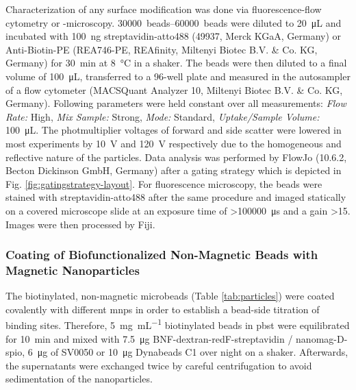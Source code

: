 Characterization of any surface modification was done via fluorescence-flow cytometry or -microscopy. \SIrange{30000}{60000}{beads} were diluted to \SI{20}{\micro\liter} and incubated with \SI{100}{\nano\gram} streptavidin-atto488 (49937, Merck KGaA, Germany) or Anti-Biotin-PE (REA746-PE, REAfinity, Miltenyi Biotec B.V. \& Co. KG, Germany) for \SI{30}{\minute} at \SI{8}{\degreeCelsius} in a shaker. The beads were then diluted to a final volume of \SI{100}{\micro\liter}, transferred to a 96-well plate and measured in the autosampler of a flow cytometer (MACSQuant Analyzer 10, Miltenyi Biotec B.V. \& Co. KG, Germany). Following parameters were held constant over all measurements: \textit{Flow Rate:} High, \textit{Mix Sample:} Strong, \textit{Mode:} Standard, \textit{Uptake/Sample Volume:} \SI{100}{\micro\liter}. The photmultiplier voltages of forward and side scatter were lowered in most experiments by \SI{10}{\volt} and \SI{120}{\volt} respectively due to the homogeneous and reflective nature of the particles.
Data analysis was performed by FlowJo (10.6.2, Becton Dickinson GmbH, Germany) after a gating strategy which is depicted in Fig. \ref{fig:gatingstrategy-layout}. 
For fluorescence microscopy, the beads were stained with streptavidin-atto488 after the same procedure and imaged statically on a covered microscope slide at an exposure time of \SI{>100000}{\micro\second} and a gain \num{>15}. Images were then processed by Fiji.
\subsubsection{Coating of Biofunctionalized Non-Magnetic Beads with Magnetic Nanoparticles}
\label{sec:meth:coatingMNPs}
The biotinylated, non-magnetic microbeads (Table \ref{tab:particles}) were coated covalently with different \glspl{mnp} in order to establish a bead-side titration of binding sites. Therefore, \SI{5}{\milli\gram\per\milli\liter} biotinylated beads in \gls{pbst} were equilibrated for \SI{10}{\minute} and mixed with \SI{7.5}{\micro\gram} BNF-dextran-redF-streptavidin / nanomag-D-spio, \SI{6}{\micro\gram} of SV0050 or \SI{10}{\micro\gram} Dynabeads C1 over night on a shaker. Afterwards, the supernatants were exchanged twice by careful centrifugation to avoid sedimentation of the nanoparticles.

